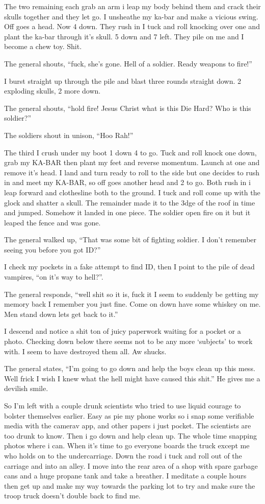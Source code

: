 The two remaining each grab an arm i leap my body behind them and crack their skulls together and they let go. I unsheathe my ka-bar and make a vicious swing. Off goes a head. Now 4 down. They rush in I tuck and roll knocking over one and plant the ka-bar through it's skull. 5 down and 7 left. They pile on me and I become a chew toy. Shit.

The general shouts, ``fuck, she's gone. Hell of a soldier. Ready weapons to fire!''

I burst straight up through the pile and blast three rounds straight down. 2 exploding skulls, 2 more down.

The general shouts, ``hold fire! Jesus Christ what is this Die Hard? Who is this soldier?''

The soldiers shout in unison, ``Hoo Rah!''

The third I crush under my boot 1 down 4 to go. Tuck and roll knock one down, grab my KA-BAR then plant my feet and reverse momentum. Launch at one and remove it's head. I land and turn ready to roll to the side but one decides to rush in and meet my KA-BAR, so off goes another head and 2 to go. Both rush in i leap forward and clothesline both to the ground. I tuck and roll come up with the glock and shatter a skull. The remainder made it to the 3dge of the roof in time and jumped. Somehow it landed in one piece. The soldier open fire on it but it leaped the fence and was gone.

The general walked up, ``That was some bit of fighting soldier. I don't remember seeing you before you got ID?'' 

I check my pockets in a fake attempt to find ID, then I point to the pile of dead vampires, ``on it's way to hell?''. 

The general responds, ``well shit so it is, fuck it I seem to suddenly be getting my memory back I remember you just fine. Come on down have some whiskey on me. Men stand down lets get back to it.'' 

I descend and notice a shit ton of juicy paperwork waiting for a pocket or a photo. Checking down below there seems not to be any more `subjects' to work with. I seem to have destroyed them all. Aw shucks. 

The general states, ``I'm going to go down and help the boys clean up this mess. Well frick I wish I knew what the hell might have caused this shit.'' He gives me a devilish smile.

So I'm left with a couple drunk scientists who tried to use liquid courage to bolster themselves earlier. Easy as pie my phone works so i snap some verifiable media with the camerav app, and other papers i just pocket. The scientists are too drunk to know. Then i go down and help clean up. The whole time snapping photos where i can. When it's time to go everyone boards the truck except me who holds on to the undercarriage. Down the road i tuck and roll out of the carriage and into an alley. I move into the rear area of a shop with spare garbage cans and a huge propane tank and take a breather. I meditate a couple hours then get up and make my way towards the parking lot to try and make sure the troop truck doesn't double back to find me.

